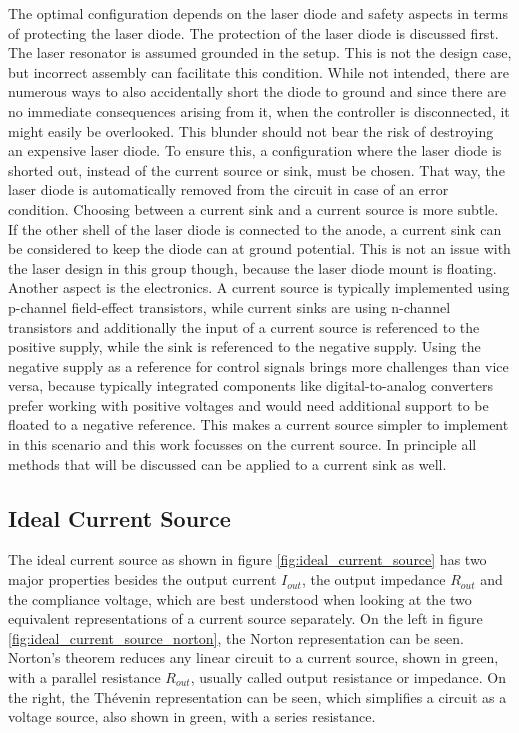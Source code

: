 The optimal configuration depends on the laser diode and safety aspects in terms of protecting the laser diode. The protection of the laser diode is discussed first. The laser resonator is assumed grounded in the setup. This is not the design case, but incorrect assembly can facilitate this condition. While not intended, there are numerous ways to also accidentally short the diode to ground and since there are no immediate consequences arising from it, when the controller is disconnected, it might easily be overlooked. This blunder should not bear the risk of destroying an expensive laser diode. To ensure this, a configuration where the laser diode is shorted out, instead of the current source or sink, must be chosen. That way, the laser diode is automatically removed from the circuit in case of an error condition.
Choosing between a current sink and a current source is more subtle. If the other shell of the laser diode is connected to the anode, a current sink can be considered to keep the diode can at ground potential. This is not an issue with the laser design in this group though, because the laser diode mount is floating. Another aspect is the electronics. A current source is typically implemented using p-channel field-effect transistors, while current sinks are using n-channel transistors and additionally the input of a current source is referenced to the positive supply, while the sink is referenced to the negative supply. Using the negative supply as a reference for control signals brings more challenges than vice versa, because typically integrated components like digital-to-analog converters prefer working with positive voltages and would need additional support to be floated to a negative reference. This makes a current source simpler to implement in this scenario and this work focusses on the current source. In principle all methods that will be discussed can be applied to a current sink as well.

\subsection{Ideal Current Source}
The ideal current source as shown in figure \ref{fig:ideal_current_source} has two major properties besides the output current $I_{out}$, the output impedance $R_{out}$ and the compliance voltage, which are best understood when looking at the two equivalent representations of a current source separately. On the left in figure \ref{fig:ideal_current_source_norton}, the Norton representation can be seen. Norton's theorem reduces any linear circuit to a current source, shown in green, with a parallel resistance $R_{out}$, usually called output resistance or impedance. On the right, the Thévenin representation can be seen, which simplifies a circuit as a voltage source, also shown in green, with a series resistance.

